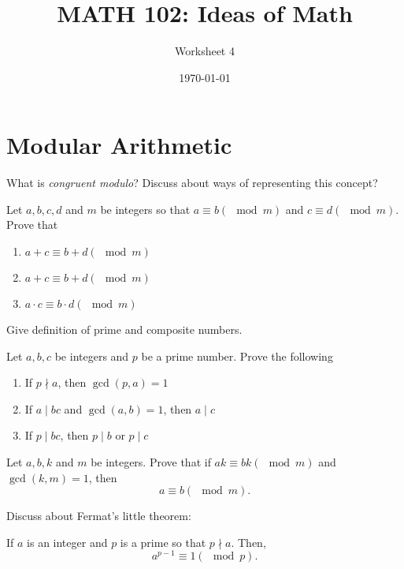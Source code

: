\documentclass[12pt]{amsart}
\title{ MATH 102: Ideas  of Math }
\author{ Worksheet 4 }
\date{\today}
\begin{document}
\maketitle


\section{Modular Arithmetic}

\begin{question}
	What is \emph{congruent modulo}?
	Discuss about ways of representing this concept?
\end{question}


\begin{question}
	Let $a,b,c,d$ and $m$ be integers so that $a \equiv b (\mod m)$ and
	$c \equiv d (\mod m)$.
	Prove that
	\begin{enumerate}
		\item $a + c \equiv b + d (\mod m)$
		\item $a + c \equiv b + d (\mod m)$
		\item $a \cdot c \equiv b \cdot d (\mod m)$
	\end{enumerate}
\end{question}

\begin{question}
	Give definition of prime and composite numbers.
\end{question}

\begin{question}
	Let $a,b,c$ be integers and $p$ be a prime number.
	Prove the following
	\begin{enumerate}
		\item If $p\nmid a$, then $\gcd(p,a) = 1$
		\item If $a \mid bc$ and $\gcd(a,b) = 1$, then $a \mid c$
		\item If $p \mid bc$, then $p \mid b$ or $p \mid c$
	\end{enumerate}
\end{question}

\begin{question}
	Let $a,b, k$ and $m$ be integers.
	Prove that if $ak \equiv bk (\mod m)$ and $\gcd(k,m) = 1$, then
	$$a \equiv b (\mod m).$$
\end{question}

\begin{question}
	Discuss about Fermat's little theorem:

	If $a$ is an integer and $p$ is a prime so that $p\nmid a$. Then,
	$$ a^{p-1} \equiv 1 (\mod p).$$
\end{question}
\end{document}
